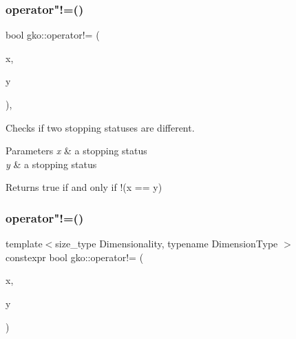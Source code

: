 \subsubsection{\texorpdfstring{operator"!=()}{operator!=()}\hspace{0.1cm}{\footnotesize\ttfamily [1/3]}}
{\footnotesize\ttfamily bool gko\+::operator!= (\begin{DoxyParamCaption}\item[{const \hyperlink{classgko_1_1stopping__status}{stopping\+\_\+status} \&}]{x,  }\item[{const \hyperlink{classgko_1_1stopping__status}{stopping\+\_\+status} \&}]{y }\end{DoxyParamCaption})\hspace{0.3cm}{\ttfamily [inline]}, {\ttfamily [noexcept]}}



Checks if two stopping statuses are different. 


\begin{DoxyParams}{Parameters}
{\em x} & a stopping status \\
\hline
{\em y} & a stopping status\\
\hline
\end{DoxyParams}
\begin{DoxyReturn}{Returns}
true if and only if {\ttfamily !(x == y)} 
\end{DoxyReturn}
\mbox{\label{namespacegko_a74c3716da36cbedc000aa24006b0bd46}} 
\subsubsection{\texorpdfstring{operator"!=()}{operator!=()}\hspace{0.1cm}{\footnotesize\ttfamily [2/3]}}
{\footnotesize\ttfamily template$<$size\+\_\+type Dimensionality, typename Dimension\+Type $>$ \\
constexpr bool gko\+::operator!= (\begin{DoxyParamCaption}\item[{const \hyperlink{structgko_1_1dim}{dim}$<$ Dimensionality, Dimension\+Type $>$ \&}]{x,  }\item[{const \hyperlink{structgko_1_1dim}{dim}$<$ Dimensionality, Dimension\+Type $>$ \&}]{y }\end{DoxyParamCaption})\hspace{0.3cm}{\ttfamily [inline]}}




